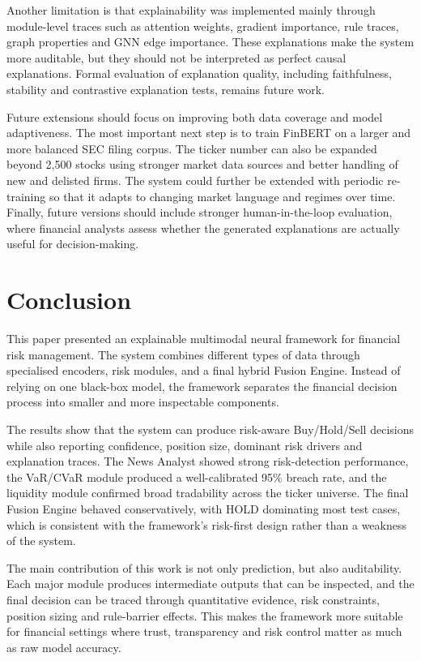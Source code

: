 \documentclass[conference]{IEEEtran}
\begin{document}
Another limitation is that explainability was implemented mainly through module-level traces such as attention weights, gradient importance, rule traces, graph properties and GNN edge importance. These explanations make the system more auditable, but they should not be interpreted as perfect causal explanations. Formal evaluation of explanation quality, including faithfulness, stability and contrastive explanation tests, remains future work.

Future extensions should focus on improving both data coverage and model adaptiveness. The most important next step is to train FinBERT on a larger and more balanced SEC filing corpus. The ticker number can also be expanded beyond 2,500 stocks using stronger market data sources and better handling of new and delisted firms. The system could further be extended with periodic re-training so that it adapts to changing market language and regimes over time. Finally, future versions should include stronger human-in-the-loop evaluation, where financial analysts assess whether the generated explanations are actually useful for decision-making.
 
\section{Conclusion}

This paper presented an explainable multimodal neural framework for financial risk management. The system combines different types of data through specialised encoders, risk modules, and a final hybrid Fusion Engine. Instead of relying on one black-box model, the framework separates the financial decision process into smaller and more inspectable components.

The results show that the system can produce risk-aware Buy/Hold/Sell decisions while also reporting confidence, position size, dominant risk drivers and explanation traces. The News Analyst showed strong risk-detection performance, the VaR/CVaR module produced a well-calibrated 95\% breach rate, and the liquidity module confirmed broad tradability across the ticker universe. The final Fusion Engine behaved conservatively, with HOLD dominating most test cases, which is consistent with the framework's risk-first design rather than a weakness of the system.

The main contribution of this work is not only prediction, but also auditability. Each major module produces intermediate outputs that can be inspected, and the final decision can be traced through quantitative evidence, risk constraints, position sizing and rule-barrier effects. This makes the framework more suitable for financial settings where trust, transparency and risk control matter as much as raw model accuracy.
    
\end{document}
